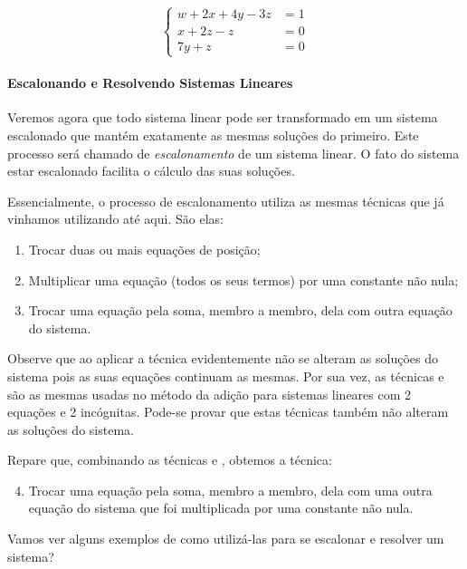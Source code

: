 \begin{equation*}
\left \{
\begin{aligned}
w+2x+4y-3z&=1\\
x+2z-z&=0\\
7y+z&=0
\end{aligned}
\right.
\end{equation*}

\paragraph{Escalonando e Resolvendo Sistemas Lineares}

Veremos agora que todo sistema linear pode ser transformado em um sistema escalonado que mantém exatamente as mesmas soluções do primeiro. Este processo será chamado de \emph{escalonamento} de um sistema linear. O fato do sistema estar escalonado facilita o cálculo das suas soluções.

Essencialmente, o processo de escalonamento utiliza as mesmas técnicas que já vinhamos utilizando até aqui. São elas:

\begin{enumerate}
\item{} 
Trocar duas ou mais equações de posição;
\item{}
Multiplicar uma equação (todos os seus termos) por uma constante não nula;
\item{} Trocar uma equação pela soma, membro a membro, dela com outra equação do sistema.
\end{enumerate}


Observe que ao aplicar a técnica  evidentemente não se alteram as soluções do sistema pois as suas equações continuam as mesmas. Por sua vez, as técnicas  e  são as mesmas usadas no método da adição para sistemas lineares com 2 equações e 2 incógnitas. Pode-se provar que estas técnicas também não alteram as soluções do sistema.

Repare que, combinando as técnicas  e , obtemos a técnica:

\begin{enumerate}\setcounter{enumi}{3}
\item Trocar uma equação pela soma, membro a membro, dela com uma outra equação do sistema que foi multiplicada por uma constante não nula.
\end{enumerate}


Vamos ver alguns exemplos de como utilizá-las para se escalonar e resolver um sistema?



